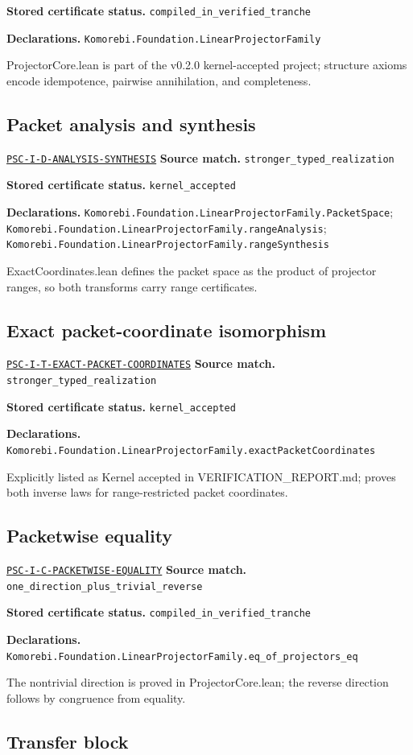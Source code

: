 \documentclass[a4paper,11pt]{article}
\newcommand{\field}[2]{\noindent\textbf{#1.} #2\par}
\begin{document}
\field{Stored certificate status}{\nolinkurl{compiled_in_verified_tranche}}
\field{Declarations}{\nolinkurl{Komorebi.Foundation.LinearProjectorFamily}}
ProjectorCore.lean is part of the v0.2.0 kernel-accepted project; structure axioms encode idempotence, pairwise annihilation, and completeness.
\subsection*{Packet analysis and synthesis}
\hyperref[rec:PSC-I-D-ANALYSIS-SYNTHESIS]{\nolinkurl{PSC-I-D-ANALYSIS-SYNTHESIS}}
\field{Source match}{\nolinkurl{stronger_typed_realization}}
\field{Stored certificate status}{\nolinkurl{kernel_accepted}}
\field{Declarations}{\nolinkurl{Komorebi.Foundation.LinearProjectorFamily.PacketSpace}; \nolinkurl{Komorebi.Foundation.LinearProjectorFamily.rangeAnalysis}; \nolinkurl{Komorebi.Foundation.LinearProjectorFamily.rangeSynthesis}}
ExactCoordinates.lean defines the packet space as the product of projector ranges, so both transforms carry range certificates.
\subsection*{Exact packet-coordinate isomorphism}
\hyperref[rec:PSC-I-T-EXACT-PACKET-COORDINATES]{\nolinkurl{PSC-I-T-EXACT-PACKET-COORDINATES}}
\field{Source match}{\nolinkurl{stronger_typed_realization}}
\field{Stored certificate status}{\nolinkurl{kernel_accepted}}
\field{Declarations}{\nolinkurl{Komorebi.Foundation.LinearProjectorFamily.exactPacketCoordinates}}
Explicitly listed as Kernel accepted in VERIFICATION\_REPORT.md; proves both inverse laws for range-restricted packet coordinates.
\subsection*{Packetwise equality}
\hyperref[rec:PSC-I-C-PACKETWISE-EQUALITY]{\nolinkurl{PSC-I-C-PACKETWISE-EQUALITY}}
\field{Source match}{\nolinkurl{one_direction_plus_trivial_reverse}}
\field{Stored certificate status}{\nolinkurl{compiled_in_verified_tranche}}
\field{Declarations}{\nolinkurl{Komorebi.Foundation.LinearProjectorFamily.eq_of_projectors_eq}}
The nontrivial direction is proved in ProjectorCore.lean; the reverse direction follows by congruence from equality.
\subsection*{Transfer block}
\end{document}
